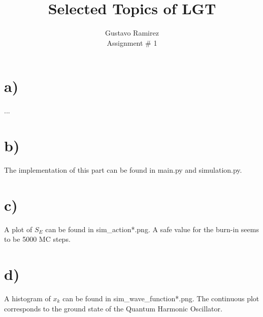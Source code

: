\documentclass[11pt]{article}
\title{\textbf{Selected Topics of LGT}}
\author{Gustavo Ramirez\\
		Assignment \# 1}
\date{}
\begin{document}
\maketitle

\section{a)}

...


\section{b)}

The implementation of this part can be found in main.py and simulation.py.


\section{c)}

A plot of $S_E$ can be found in sim\_action*.png. A safe value for the burn-in seems to be 5000 MC steps.


\section{d)}

A histogram of $x_k$ can be found in sim\_wave\_function*.png. The continuous plot corresponds to the ground state of the Quantum Harmonic Oscillator.
\end{document}
